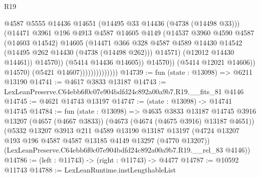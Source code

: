 \begin{lexlean}{R19}
\begin{coremodule}
                                          @4587
                                          @5555
                                          @14436
                                          @14651
                                          (@14495 @33 @14436 (@4738 (@14498 @33)))
                                          (@14471
                                            @3961
                                            @196
                                            @4913
                                            @4587
                                            @14605
                                            @4149
                                            (@14537
                                              @3960
                                              @4590
                                              @4587
                                              (@14603 @14542)
                                              @14605
                                              (@14471
                                                @366
                                                @328
                                                @4587
                                                @4589
                                                @14430
                                                @14542
                                                (@14495 @262 @14430 (@4738 (@14498 @262)))
                                                @14571)
                                              (@12012 @14430 @14461))
                                            @14570))
                                        (@5414 @14436 @14605))
                                      @14570))
                                  (@5414 @12021 @14606))
                                @14570)
                              (@5421 @14607))))))))))))))
@14739 := fun (state : @13098) => @6211 @13190
@14741 := @4617 @3833 @13187
@14743 := LexLeanPreserve.C64ebb6f0c07e904bdfd24c892a00a9b7.R19.__fits_81 @4146
@14745 := @4621 @14743 @13197
@14747 := (state : @13098) -> @14741 @14745
@14784 := fun (state : @13098) =>
  @4635
    @3833
    @13187
    @14745
    @3916
    @13207
    (@4657 (@4667 @3833))
    (@4673 (@4674 (@4675 @3916) @13187 @4651))
    (@5332
      @13207
      @3913
      @211
      @4589
      @13190
      @13187
      @13197
      (@4724 @13207 @193 @196 @4587 @4587 @13185 @4149 @13297 (@4770 @13207))
      (LexLeanPreserve.C64ebb6f0c07e904bdfd24c892a00a9b7.R19.__rel_83 @4146))
@14786 := (left : @11743) -> (right : @11743) -> @4477
@14787 := @10592 @11743
@14788 := LexLeanRuntime.instLengthableList

\end{coremodule}
\end{lexlean}

